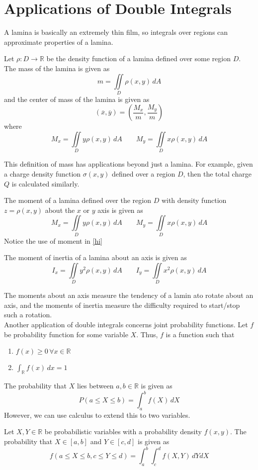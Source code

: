 \section{Applications of Double Integrals}
A lamina is basically an extremely thin film, so integrals over regions can approximate properties of a lamina. 
\begin{definition}\label{hi}
    Let \(\rho :D \to \mathbb{R}\) be the density function of a lamina defined over some region \(D\). The mass of the lamina is given as 
    \[
        m=\iint\limits_{D}\rho (x,y)\,dA
    \]
    and the center of mass of the lamina is given as 
    \[
        (\overline{x} ,\overline{y} )=\left( \frac{M_x}{m},\frac{M_y}{m} \right)
    \]
    where 
    \[
        M_x =\iint\limits_{D}y \rho (x,y)\,dA\qquad M_y =\iint\limits_{D}x \rho (x,y)\,dA
    \]
\end{definition}
\begin{remark}
    This definition of mass has applications beyond just a lamina. For example, given a charge density function \(\sigma (x,y)\) defined over a region \(D\), then the total charge \(Q\) is calculated similarly.
\end{remark}
\begin{definition}
    The moment of a lamina defined over the region \(D\) with density function \(z=\rho (x,y)\) about the \(x\) or \(y\) axis is given as 
    \[
        M_x =\iint\limits_{D} y \rho (x,y)\,dA\qquad M_y =\iint\limits_{D}x \rho (x,y)\,dA
    \]
    Notice the use of moment in \ref{hi}
\end{definition}
\begin{definition}
    The moment of inertia of a lamina about an axis is given as 
    \[
        I_x =\iint\limits_{D}y^2 \rho (x,y)\,dA\qquad I_y =\iint\limits_{D}x^2 \rho (x,y)\,dA
    \]
\end{definition}
The moments about an axis measure the tendency of a lamin ato rotate about an axis, and the moments of inertia measure the difficulty required to start/stop such a rotation.\\
Another application of double integrals concerns joint probability functions. Let \(f\) be probability function for some variable \(X\). Thus, \(f\) is a function such that 
\begin{enumerate}
    \item \(f(x)\geq 0\,\forall x\in\mathbb{R}\)
    \item \(\int_\mathbb{R} f(x)\,dx =1\) 
\end{enumerate}
The probability that \(X\) lies between \(a,b\in\mathbb{R}\) is given as 
\[
    P(a\leq X\leq b)=\int_a^b f(X)\,dX
\]
However, we can use calculus to extend this to two variables.
\begin{definition}
    Let \(X,Y\in\mathbb{R}\) be probabilistic variables with a probability density \(f(x,y)\). The probability that \(X\in[a,b]\) and \(Y\in[c,d]\) is given as 
    \[
        f(a\leq X\leq b,c\leq Y\leq d)=\int_a^b \int_c^d f(X,Y)\,dYdX
    \]
\end{definition}
